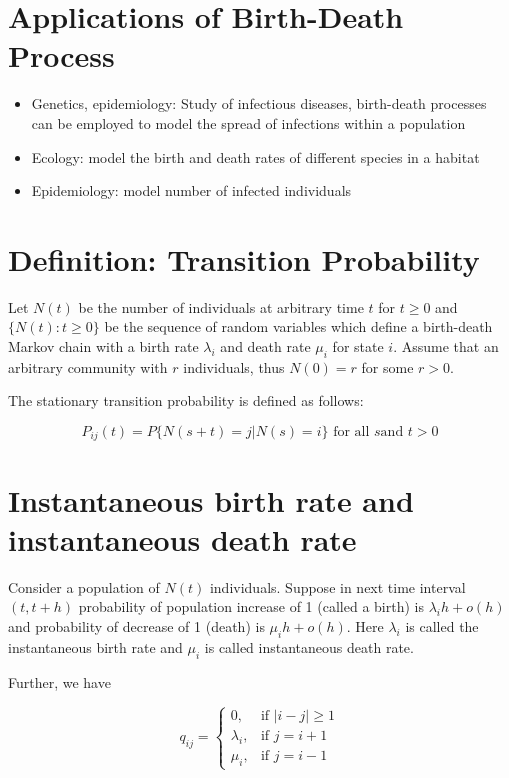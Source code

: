 \documentclass[
  letterpaper,
  DIV=11,
  numbers=noendperiod]{scrreprt}
\begin{document}
\section{Applications of Birth-Death
Process}\label{applications-of-birth-death-process}

\begin{itemize}
\item
  Genetics, epidemiology: Study of infectious diseases, birth-death
  processes can be employed to model the spread of infections within a
  population
\item
  Ecology: model the birth and death rates of different species in a
  habitat
\item
  Epidemiology: model number of infected individuals
\end{itemize}

\section{Definition: Transition
Probability}\label{definition-transition-probability}

Let \(N(t)\) be the number of individuals at arbitrary time \(t\) for
\(t \geq 0\) and \(\{N(t): t \geq 0\}\) be the sequence of random
variables which define a birth-death Markov chain with a birth rate
\(\lambda_i\) and death rate \(\mu_i\) for state \(i\). Assume that an
arbitrary community with \(r\) individuals, thus \(N(0) = r\) for some
\(r > 0\).

The stationary transition probability is defined as follows:

\[P_{ij}(t) = P\{N(s+t) = j|N(s) = i\} \text{ for all } s \text{and } t>0\]

\section{Instantaneous birth rate and instantaneous death
rate}\label{instantaneous-birth-rate-and-instantaneous-death-rate}

Consider a population of \(N(t)\) individuals. Suppose in next time
interval \((t, t+h)\) probability of population increase of 1 (called a
birth) is \(\lambda_ih + o(h)\) and probability of decrease of 1 (death)
is \(\mu_ih + o(h)\). Here \(\lambda_i\) is called the instantaneous
birth rate and \(\mu_i\) is called instantaneous death rate.

Further, we have

\[
    q_{ij}= 
\begin{cases}
    0,& \text{if } |i-j|\geq 1\\
    \lambda_i, & \text{if } j=i+1\\
    \mu_{i},              & \text{if } j=i-1
\end{cases}
\]
\end{document}

